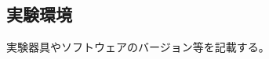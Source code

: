 \documentclass[../../../main]{subfiles}
\begin{document}
    \subsection{実験環境}\label{subsec:method-environment}

    実験器具やソフトウェアのバージョン等を記載する。
\end{document}

